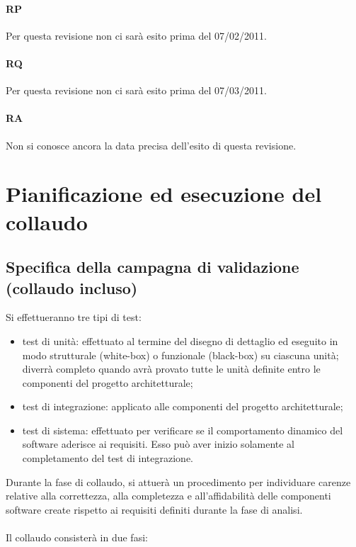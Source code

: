 \subsubsection{RP}
Per questa revisione non ci sar\`a esito prima del 07/02/2011.

\subsubsection{RQ}
Per questa revisione non ci sar\`a esito prima del 07/03/2011.

\subsubsection{RA}
Non si conosce ancora la data precisa dell'esito di questa revisione.



\chapter{Pianificazione ed esecuzione del \\collaudo}
\thispagestyle{fancy} %

\section{Specifica della campagna di validazione \\(collaudo incluso)}
Si effettueranno tre tipi di test:

\begin{itemize}
	\item test di unit\`a: effettuato al termine del disegno di dettaglio ed eseguito
in modo strutturale (white-box) o funzionale (black-box) su ciascuna unit\`a; diverr\`a completo quando avr\`a provato tutte le unit\`a definite entro le
componenti del progetto architetturale;
	\item test di integrazione: applicato alle componenti del progetto
architetturale;
	\item test di sistema: effettuato per verificare se il comportamento dinamico
del software aderisce ai requisiti. Esso pu\`o aver inizio solamente al
completamento del test di integrazione.
\end{itemize}

Durante la fase di collaudo, si attuer\`a un procedimento per individuare carenze
relative alla correttezza, alla completezza e all'affidabilit\`a delle componenti 
software create rispetto ai requisiti definiti durante la fase di analisi.\\ \\
Il collaudo consister\`a in due fasi: 


